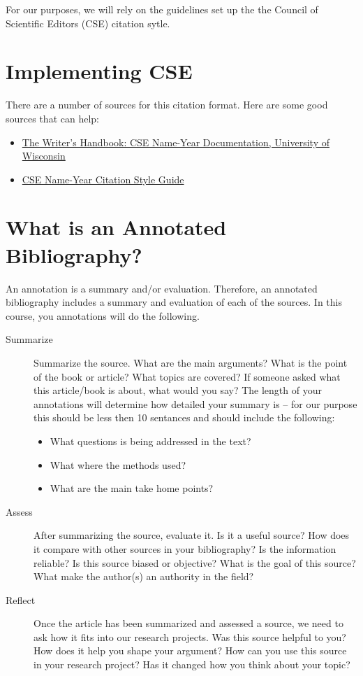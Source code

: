 \documentclass{article}\usepackage[]{graphicx}\usepackage[]{color}
\begin{document}
For our purposes, we will rely on the guidelines set up the the Council of Scientific Editors (CSE) citation sytle. 

\section{Implementing CSE}

There are a number of sources for this citation format. Here are some good sources that can help:

\begin{itemize}
  \item \href{https://writing.wisc.edu/Handbook/DocCSE_NameYear.html}{The Writer's Handbook: CSE Name-Year Documentation, University of Wisconsin}

  \item \href{https://www.mcgill.ca/library/files/library/cse-name-year-citation-style-guide.pdf}{CSE Name-Year Citation Style Guide}
\end{itemize}

\section{What is an Annotated Bibliography?}

An annotation is a summary and/or evaluation. Therefore, an annotated bibliography includes a summary and evaluation of each of the sources. In this course, you annotations will do the following.

\begin{description}
  \item[Summarize] Summarize the source. What are the main arguments? What is the point of the book or article? What topics are covered? If someone asked what this article/book is about, what would you say? The length of your annotations will determine how detailed your summary is -- for our purpose this should be less then 10 sentances and should include the following:
  
\begin{itemize}
  \item What questions is being addressed in the text?
  \item What where the methods used?
  \item What are the main take home points?  
\end{itemize}

\item[Assess] After summarizing the source, evaluate it. Is it a useful source? How does it compare with other sources in your bibliography? Is the information reliable? Is this source biased or objective? What is the goal of this source? What make the author(s) an authority in the field?

\item[Reflect] Once the article has been summarized and assessed a source, we need to ask how it fits into our research projects. Was this source helpful to you? How does it help you shape your argument? How can you use this source in your research project? Has it changed how you think about your topic? 


\end{description}
\end{document}
